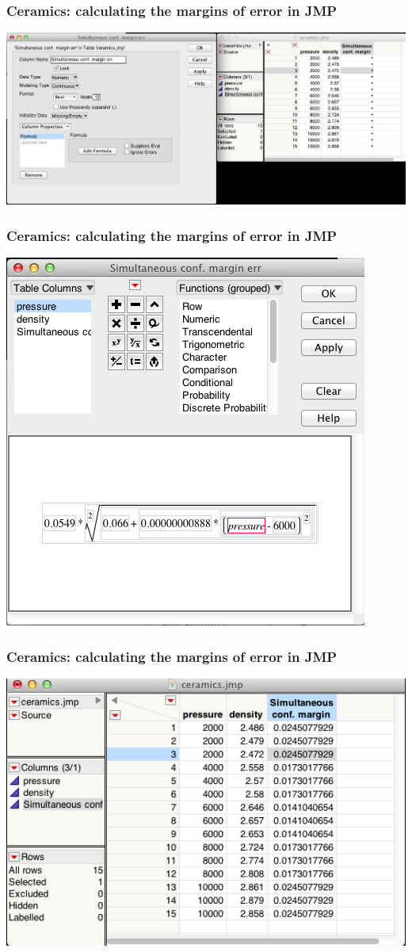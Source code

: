 \documentclass[handout]{beamer}\usepackage[]{graphicx}\usepackage[]{color}
\numberwithin{equation}{section}
\begin{document}
\begin{frame}
\frametitle{Ceramics: calculating the margins of error in JMP}
 \includegraphics{../../fig/jfs2.png}
\end{frame}

\begin{frame}
\frametitle{Ceramics: calculating the margins of error in JMP}
 \includegraphics{../../fig/jfs3.png}
\end{frame}

\begin{frame}
\frametitle{Ceramics: calculating the margins of error in JMP}
 \includegraphics{../../fig/jfs4.png}
\end{frame}
\end{document}
